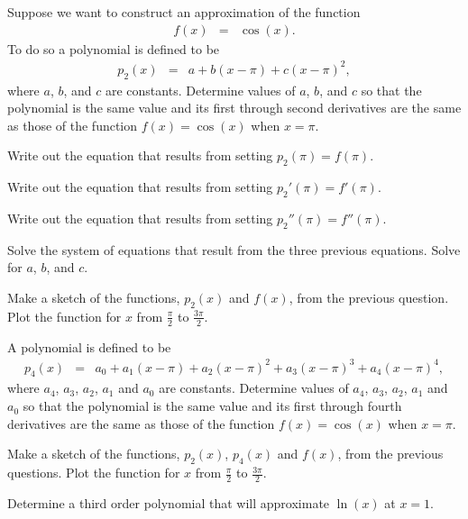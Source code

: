 \begin{problem}
\item Suppose we want to construct an approximation of the function
  \begin{eqnarray*}
    f(x) & = & \cos(x).
  \end{eqnarray*}
  To do so a polynomial is defined to be
  \begin{eqnarray*}
    p_2(x) & = & a + b (x-\pi) + c (x-\pi)^2 ,
  \end{eqnarray*}
  where $a$, $b$, and $c$ are constants.  Determine
  values of $a$, $b$,  and $c$ so that the
  polynomial is the same value and its first through second
  derivatives are the same as those of the function $f(x)=\cos(x)$ when
  $x=\pi$.
  \begin{subproblem}
  \item Write out the equation that results from setting $p_2(\pi)=f(\pi)$.
  \vfill
  \item Write out the equation that results from setting $p_2'(\pi)=f'(\pi)$.
  \vfill
  \item Write out the equation that results from setting $p_2''(\pi)=f''(\pi)$.
  \vfill
  \item Solve the system of equations that result from the three previous equations. Solve for $a$, $b$, and $c$.
  \vfill
  \vfill
  \end{subproblem}

\item Make a sketch of the functions, $p_2(x)$ and $f(x)$, from the
  previous question. Plot the function for $x$ from $\frac{\pi}{2}$ to
    $\frac{3\pi}{2}$.

  \vspace{5em}


  \clearpage

\item A polynomial is defined to be
  \begin{eqnarray*}
    p_4(x) & = &  a_0 + a_1 (x-\pi) +  a_2 (x-\pi)^2 +  a_3 (x-\pi)^3 +  a_4 (x-\pi)^4,
  \end{eqnarray*}
  where $a_4$, $a_3$, $a_2$, $a_1$ and $a_0$ are constants.  Determine
  values of $a_4$, $a_3$, $a_2$, $a_1$ and $a_0$ so that the
  polynomial is the same value and its first through fourth
  derivatives are the same as those of the function $f(x)=\cos(x)$ when
  $x=\pi$.

  \vfill

\item Make a sketch of the functions, $p_2(x)$, $p_4(x)$ and $f(x)$,
  from the previous questions. Plot the function for $x$ from $\frac{\pi}{2}$ to
    $\frac{3\pi}{2}$.

  \vspace{5em}

  \clearpage

\item Determine a third order polynomial that will approximate $\ln(x)$ at $x=1$.
  \vfill

\end{problem}


